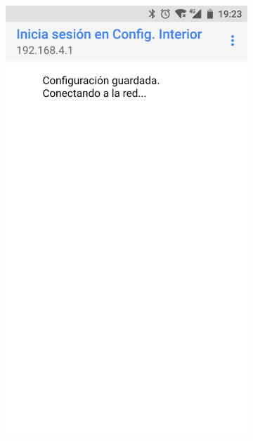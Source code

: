 \begin{figure}
\begin{subfigure}{0.49\columnwidth}
  \centering
  \includegraphics[width=1\columnwidth,frame]{images/interior-config-saved}
  \caption{}
  \label{fig:interior-config-saved}
\end{subfigure}
\hfill
\begin{subfigure}{0.49\columnwidth}
  \centering

\end{subfigure}
\end{figure}
